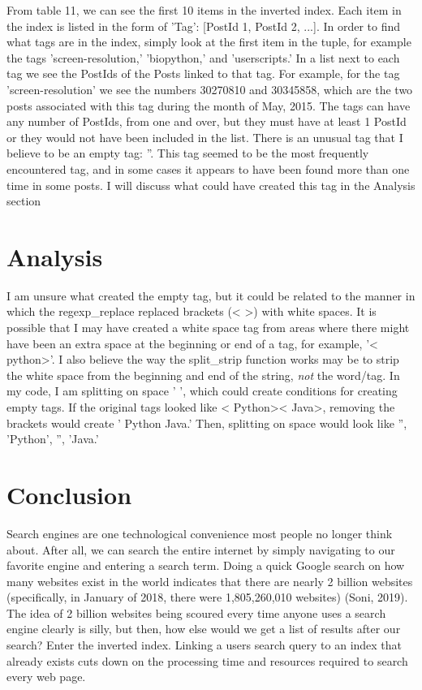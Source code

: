 \documentclass[]{article}
\begin{document}
From table 11, we can see the first 10 items in the inverted index.  Each item in the index is listed in the form of {'Tag': [PostId 1, PostId 2, ...]}.  In order to find what tags are in the index, simply look at the first item in the tuple, for example the tags 'screen-resolution,' 'biopython,' and 'userscripts.'  In a list next to each tag we see the PostIds of the Posts linked to that tag.  For example, for the tag 'screen-resolution' we see the numbers 30270810 and 30345858, which are the two posts associated with this tag during the month of May, 2015.  The tags can have any number of PostIds, from one and over, but they must have at least 1 PostId or they would not have been included in the list.  There is an unusual tag that I believe to be an empty tag: ''.  This tag seemed to be the most frequently encountered tag, and in some cases it appears to have been found more than one time in some posts.  I will discuss what could have created this tag in the Analysis section
\section{Analysis}
I am unsure what created the empty tag, but it could be related to the manner in which the regexp\_replace replaced brackets (< >) with white spaces.  It is possible that I may have created a white space tag from areas where there might have been an extra space at the beginning or end of a tag, for example, '<  python>'.  I also believe the way the split\_strip function works may be to strip the white space from the beginning and end of the string, \textit{not} the word/tag.  In my code, I am splitting on space '  ', which could create conditions for creating empty tags.  If the original tags looked like <  Python><  Java>, removing the brackets would create '  Python    Java.'  Then, splitting on space would look like '', 'Python', '', 'Java.' 

\section{Conclusion}
Search engines are one technological convenience most people no longer think about.  After all, we can search the entire internet by simply navigating to our favorite engine and entering a search term.  Doing a quick Google search on how many websites exist in the world indicates that there are nearly 2 billion websites (specifically, in January of 2018, there were 1,805,260,010 websites) (Soni, 2019). The idea of 2 billion websites being scoured every time anyone uses a search engine clearly is silly, but then, how else would we get a list of results after our search?  Enter the inverted index.  Linking a users search query to an index that already exists cuts down on the processing time and resources required to search every web page.
\end{document}

